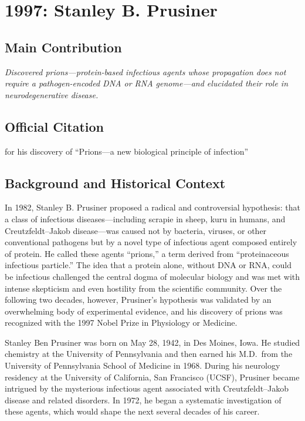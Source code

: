 \chapter[1997 --- Prusiner]{1997: Stanley B. Prusiner}
\label{ch:1997_Prusiner}

\section*{Main Contribution}

\textit{Discovered prions---protein-based infectious agents whose propagation does not require a pathogen-encoded DNA or RNA genome---and elucidated their role in neurodegenerative disease.}\cite{nobel-1997,lecture-1997}

\section{Official Citation}

for his discovery of ``Prions---a new biological principle of infection''

\section{Background and Historical Context}

In 1982, Stanley B. Prusiner proposed a radical and controversial hypothesis: that a class of infectious diseases---including scrapie in sheep, kuru in humans, and Creutzfeldt--Jakob disease---was caused not by bacteria, viruses, or other conventional pathogens but by a novel type of infectious agent composed entirely of protein. He called these agents ``prions,'' a term derived from ``proteinaceous infectious particle.'' The idea that a protein alone, without DNA or RNA, could be infectious challenged the central dogma of molecular biology and was met with intense skepticism and even hostility from the scientific community. Over the following two decades, however, Prusiner's hypothesis was validated by an overwhelming body of experimental evidence, and his discovery of prions was recognized with the 1997 Nobel Prize in Physiology or Medicine.

Stanley Ben Prusiner was born on May 28, 1942, in Des Moines, Iowa. He studied chemistry at the University of Pennsylvania and then earned his M.D.\ from the University of Pennsylvania School of Medicine in 1968. During his neurology residency at the University of California, San Francisco (UCSF), Prusiner became intrigued by the mysterious infectious agent associated with Creutzfeldt--Jakob disease and related disorders. In 1972, he began a systematic investigation of these agents, which would shape the next several decades of his career.

